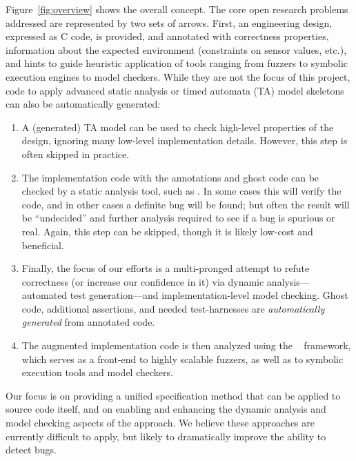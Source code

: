 Figure~\ref{fig:overview} shows the overall concept.  The core
open research problems addressed are represented by two sets of
arrows.  First, an engineering design, expressed as C code, is
provided, and annotated with correctness properties, information
about the expected environment (constraints on sensor values, etc.),
and hints to guide heuristic application of tools ranging from fuzzers
to symbolic execution engines to model checkers.
While they are not the focus of this project, code to apply advanced static analysis or timed
automata (TA) model skeletons can also be automatically generated:
\begin{enumerate}[labelsep=3pt,leftmargin=12pt]
\item A (generated) TA model can be used to check high-level properties
  of the design, ignoring many low-level implementation details. However, this step
  is often skipped in practice.
\item The implementation code with the \acsl annotations and ghost code
  can be checked by a static analysis tool, such as \framac.  In some
  cases this will verify the code, and in other cases a definite bug
  will be found; but often the result will be ``undecided'' and
  further analysis required to see if a bug is spurious or real.
 Again, this step can be skipped, though it is likely low-cost and beneficial.
\item Finally, the focus of our efforts is a multi-pronged attempt to refute correctness (or increase our confidence
  in it) via dynamic analysis---automated test generation---and
  implementation-level model checking.
  Ghost code, additional assertions, and needed test-harnesses are \emph{automatically generated} from 
  annotated code.
\item The augmented implementation code is then analyzed using the
  \deepstate~\cite{DeepState} framework, which serves as a front-end
  to highly scalable fuzzers, as well as to symbolic execution tools
  and model checkers.
\end{enumerate}

Our focus is on providing a unified specification method that can be
applied to source code itself, and on enabling and enhancing the dynamic analysis and
model
checking aspects of the approach.  We believe these approaches are
currently difficult to apply, but likely to
dramatically improve the ability to detect bugs.

